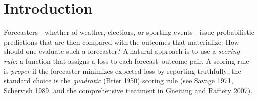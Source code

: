 \documentclass[12pt,a4paper,notitlepage]{article}
\begin{document}
\def\@biblabel#1{#1\hfill}
\def\thebibliography#1{\section*{References}
\addcontentsline{toc}{section}{References}
\list
{}{
\labelwidth 0pt
\leftmargin 1.8em
\itemindent -1.8em
\usecounter{enumi}}
\def\newblock{\hskip .11em plus .33em minus .07em}
\sloppy\clubpenalty4000\widowpenalty4000
\sfcode`\.=1000\relax\def\baselinestretch{1}\large \normalsize}
\let\endthebibliography=\endlist
\newcommand{\shfrac}[2]{\ensuremath{{}^{#1} \hspace{-0.04in}/_{\hspace{-0.03in}#2}}}
\newcommand\T{\rule{0pt}{2.6ex}}
\newcommand\B{\rule[-1.2ex]{0pt}{0pt}}%
\section{Introduction\label{s:intro}}


Forecasters---whether of weather, elections, or sporting events---issue
probabilistic predictions that are then compared with the outcomes that
materialize. How should one evaluate such a forecaster? A natural approach
is to use a \emph{scoring rule}: a function that assigns a loss to each
forecast--outcome pair. A scoring rule is \emph{proper} if the forecaster
minimizes expected loss by reporting truthfully; the standard choice is the
\emph{quadratic} (Brier 1950) scoring rule (see Savage 1971, Schervish
1989, and the comprehensive treatment in Gneiting and Raftery 2007).
\end{document}
